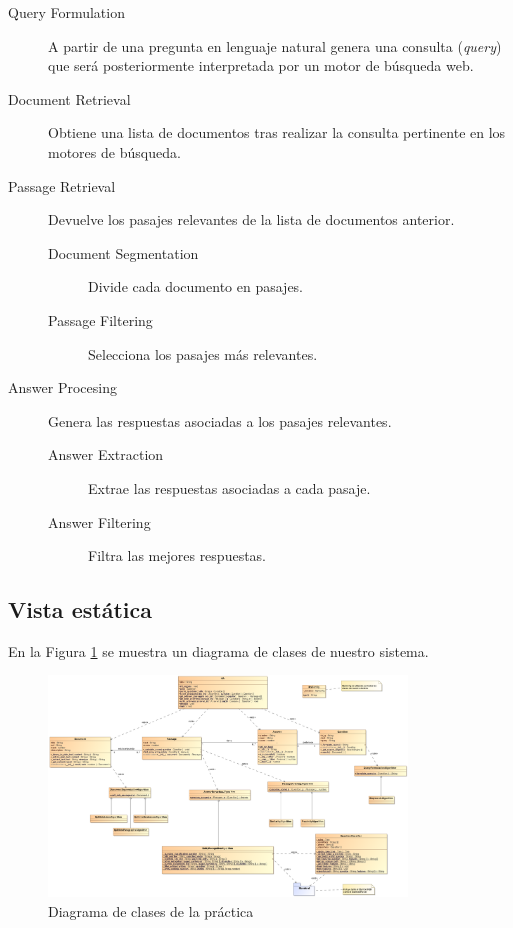 \documentclass[12pt,a4paper,titlepage]{article}
\begin{document}
\begin{description}
	\item[Query Formulation] A partir de una pregunta en lenguaje natural genera una consulta (\emph{query}) que será posteriormente interpretada por un motor de búsqueda web.
	\item[Document Retrieval] Obtiene una lista de documentos tras realizar la consulta pertinente en los motores de búsqueda.
	\item[Passage Retrieval] Devuelve los pasajes relevantes de la lista de documentos anterior.
		\begin{description}
			\item[Document Segmentation] Divide cada documento en pasajes.
			\item[Passage Filtering] Selecciona los pasajes más relevantes.
		\end{description}
	\item[Answer Procesing] Genera las respuestas asociadas a los pasajes relevantes.
		\begin{description}
			\item[Answer Extraction] Extrae las respuestas asociadas a cada pasaje.
			\item[Answer Filtering]	Filtra las mejores respuestas.
		\end{description}
\end{description}

\subsection{Vista estática}
En la Figura \ref{fig:clases} se muestra un diagrama de clases de nuestro sistema.


\begin{figure}[h!]
\begin{center}
\includegraphics[angle=90,width=0.85\textwidth]{res/clases}
\end{center}
\caption{Diagrama de clases de la práctica}
\label{fig:clases}
\end{figure}
\end{document}
